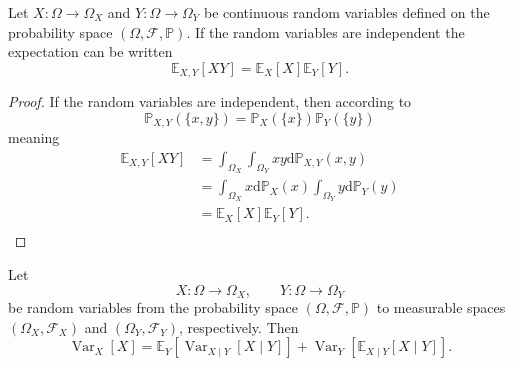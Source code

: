 \begin{theorem}
	\label{theorem:expectation_independent}
	Let $X\colon \Omega \to \Omega_X$ and $Y\colon \Omega \to \Omega_Y$ be continuous random variables defined on the probability space $(\Omega, \mathcal{F}, \mathbb{P})$. If the random variables are independent the expectation can be written
	\begin{equation}
		\mathbb{E}_{X,Y}[XY]=\mathbb{E}_X[X]\mathbb{E}_Y[Y].
	\end{equation}
\end{theorem}

\begin{proof}
	If the random variables are independent, then according to 
	\begin{equation}
		\mathbb{P}_{X,Y}(\{x,y\})=\mathbb{P}_{X}(\{x\})\mathbb{P}_{Y}(\{y\})
	\end{equation}
	meaning
	\begin{equation}
		\begin{split}
			\mathbb{E}_{X,Y}[XY] &= \int_{\Omega_X}\int_{\Omega_Y}xy\mathrm{d}\mathbb{P}_{X,Y}(x,y)\\
			&= \int_{\Omega_X}x\mathrm{d}\mathbb{P}_X(x)\int_{\Omega_Y}y\mathrm{d}\mathbb{P}_Y(y)\\
			&= \mathbb{E}_X[X]\mathbb{E}_Y[Y].\\
		\end{split}
	\end{equation}
\end{proof}


\begin{theorem}
	\label{theorem:total_variance}
	Let
	\begin{equation}
		X\colon \Omega \to \Omega_X,\qquad Y\colon \Omega \to \Omega_Y
	\end{equation}
	be random variables from the probability space $(\Omega,\mathcal{F},\mathbb{P})$ to measurable spaces $(\Omega_X,\mathcal{F}_X)$ and $(\Omega_Y,\mathcal{F}_Y)$, respectively. Then
	\begin{equation}
		\operatorname{Var}_X[X] = \mathbb{E}_Y[\operatorname{Var}_{X\mid Y}[X\mid Y]] + \operatorname{Var}_Y[\mathbb{E}_{X\mid Y}[X\mid Y]].
	\end{equation}
\end{theorem}


